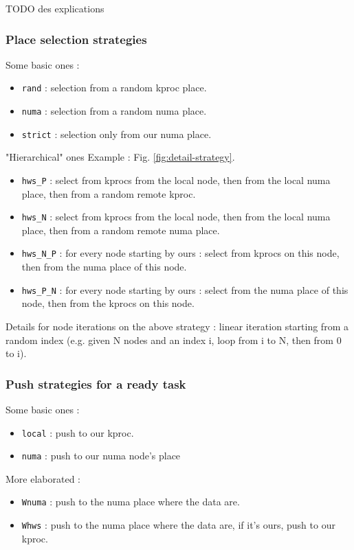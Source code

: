 \documentclass{Styles/llncs}
\begin{document}
TODO des explications
\subsubsection{Place selection strategies}
Some basic ones :
\begin{itemize}
  \item \verb/rand/ : selection from a random kproc place.
  \item \verb/numa/ : selection from a random numa place.
  \item \verb/strict/ : selection only from our numa place.
\end{itemize}

"Hierarchical" ones
Example : Fig. \ref{fig:detail-strategy}.
\begin{itemize}
  \item \verb/hws_P/ : select from kprocs from the local node, then from the local numa place, then from a random remote kproc.
  \item \verb/hws_N/ : select from kprocs from the local node, then from the local numa place, then from a random remote numa place.
  \item \verb/hws_N_P/ : for every node starting by ours : select from kprocs on this node, then from the numa place of this node.
  \item \verb/hws_P_N/ : for every node starting by ours : select from the numa place of this node, then from the kprocs on this node.
\end{itemize}

Details for node iterations on the above strategy : linear iteration starting from a random index (e.g. given N nodes and an index i, loop from i to N, then from 0 to i).

\subsubsection{Push strategies for a ready task}
Some basic ones :
\begin{itemize}
  \item \verb/local/ : push to our kproc.
  \item \verb/numa/ : push to our numa node's place
\end{itemize}

More elaborated :
\begin{itemize}
  \item \verb/Wnuma/ : push to the numa place where the data are.
  \item \verb/Whws/ : push to the numa place where the data are, if it's ours, push to our kproc.
\end{itemize}
\end{document}

